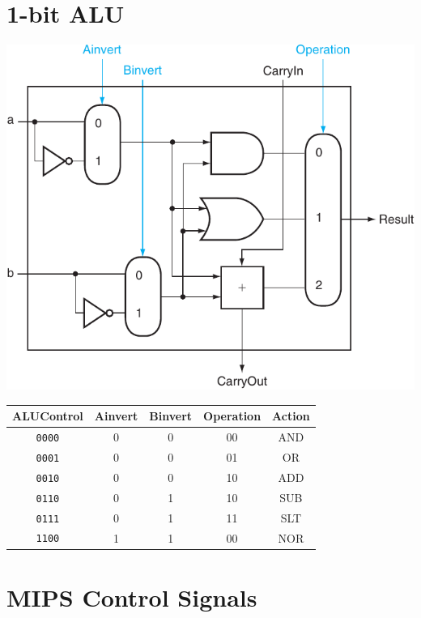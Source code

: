 \documentclass[11pt]{article}
\begin{document}
\begin{minipage}[t]{0.35\linewidth}
    \section*{1-bit ALU}
    \includegraphics[width=\linewidth]{content/alu.pdf}
    \begin{center}
        \begin{tabular}[t]{c|ccc|c}
            \toprule
            ALUControl & Ainvert & Binvert & Operation & Action \\
            \midrule
            {\tt 0000} & 0       & 0       & 00        & AND    \\
            {\tt 0001} & 0       & 0       & 01        & OR     \\
            {\tt 0010} & 0       & 0       & 10        & ADD    \\
            {\tt 0110} & 0       & 1       & 10        & SUB    \\
            {\tt 0111} & 0       & 1       & 11        & SLT    \\
            {\tt 1100} & 1       & 1       & 00        & NOR    \\
            \bottomrule
        \end{tabular}
    \end{center}
\end{minipage}

\vfill

\begin{minipage}[t]{\linewidth}
    \section*{MIPS Control Signals}

    \begin{minipage}[t]{0.28\textwidth}
        
    \end{minipage}
    \begin{minipage}[t]{0.64\textwidth}
        
    \end{minipage}
\end{minipage}
\end{document}
